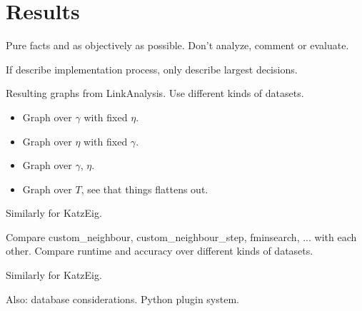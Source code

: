 \chapter{Results}\label{cha:Results}

Pure facts and as objectively as possible. Don't analyze, comment or evaluate.

If describe implementation process, only describe largest decisions.

Resulting graphs from LinkAnalysis. Use different kinds of datasets.

\begin{itemize}
    \item Graph over $\gamma$ with fixed $\eta$.
    \item Graph over $\eta$ with fixed $\gamma$.
    \item Graph over $\gamma$, $\eta$.
    \item Graph over $T$, see that things flattens out.
\end{itemize}

Similarly for KatzEig.


Compare custom\_neighbour, custom\_neighbour\_step, fminsearch, ... with each other. Compare runtime and accuracy over different kinds of datasets.

Similarly for KatzEig.

Also: database considerations. Python plugin system.


%
%
%
